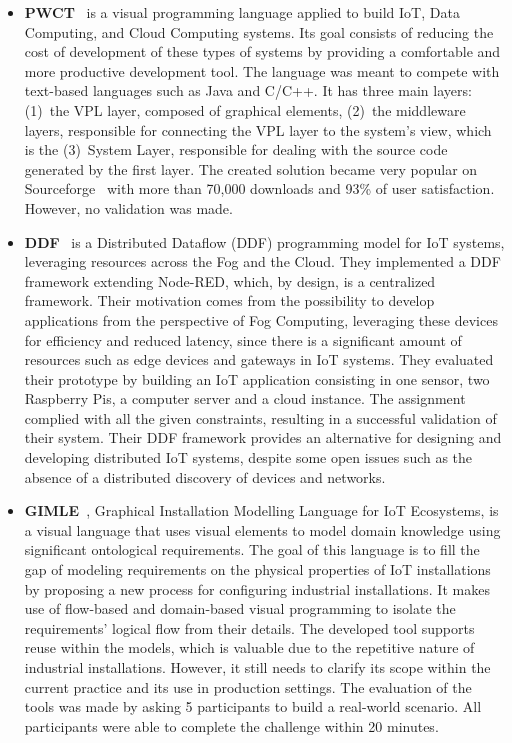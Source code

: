 \begin{itemize}
\item\textbf{PWCT}~\cite{pwct} is a visual programming language applied to build IoT, Data Computing, and Cloud Computing systems. Its goal consists of reducing the cost of development of these types of systems by providing a comfortable and more productive development tool. The language was meant to compete with text-based languages such as Java and C/C++. It has three main layers: (1)~the VPL layer, composed of graphical elements, (2)~the middleware layers, responsible for connecting the VPL layer to the system's view, which is the (3)~System Layer, responsible for dealing with the source code generated by the first layer. The created solution became very popular on Sourceforge~\cite{pwct_sourceforge} with more than 70,000 downloads and 93\% of user satisfaction. However, no validation was made.

\item\textbf{DDF}~\cite{ddf} is a Distributed Dataflow (DDF) programming model for IoT systems, leveraging resources across the Fog and the Cloud. They implemented a DDF framework extending Node-RED, which, by design, is a centralized framework. Their motivation comes from the possibility to develop applications from the perspective of Fog Computing, leveraging these devices for efficiency and reduced latency, since there is a significant amount of resources such as edge devices and gateways in IoT systems. They evaluated their prototype by building an IoT application consisting in one sensor, two Raspberry Pis, a computer server and a cloud instance. The assignment complied with all the given constraints, resulting in a successful validation of their system. Their DDF framework provides an alternative for designing and developing distributed IoT systems, despite some open issues such as the absence of a distributed discovery of devices and networks.

\item\textbf{GIMLE}~\cite{gimle}, Graphical Installation Modelling Language for IoT Ecosystems, is a visual language that uses visual elements to model domain knowledge using significant ontological requirements. The goal of this language is to fill the gap of modeling requirements on the physical properties of IoT installations by proposing a new process for configuring industrial installations. It makes use of flow-based and domain-based visual programming to isolate the requirements' logical flow from their details. The developed tool supports reuse within the models, which is valuable due to the repetitive nature of industrial installations. However, it still needs to clarify its scope within the current practice and its use in production settings. The evaluation of the tools was made by asking 5 participants to build a real-world scenario. All participants were able to complete the challenge within 20 minutes.


\end{itemize}
